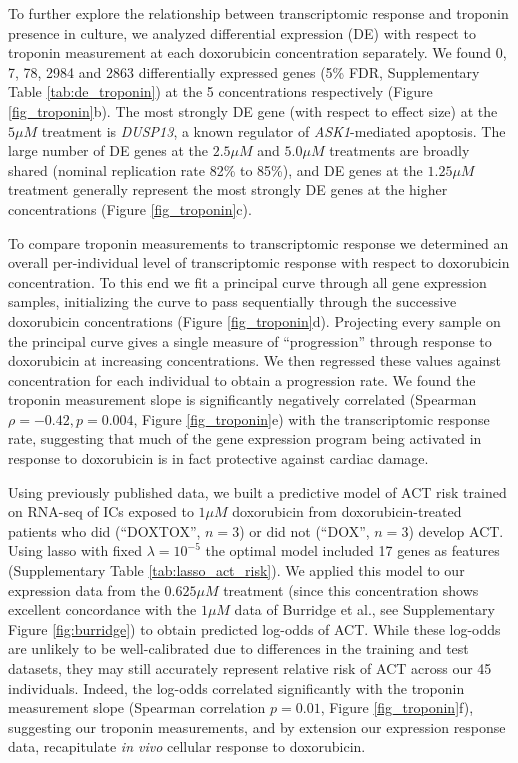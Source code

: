 \documentclass{article}
\begin{document}
To further explore the relationship between transcriptomic response and troponin presence in culture, we analyzed differential expression (DE) with respect to troponin measurement at each doxorubicin concentration separately. We found 0, 7, 78, 2984 and 2863 differentially expressed genes (5\% FDR, Supplementary Table \ref{tab:de_troponin}) at the 5 concentrations respectively (Figure \ref{fig_troponin}b). The most strongly DE gene (with respect to effect size) at the $5 \mu M$ treatment is \emph{DUSP13}, a known regulator of \emph{ASK1}-mediated apoptosis\cite{park2010positive}. The large number of DE genes at the $2.5 \mu M$ and $5.0 \mu M$ treatments are broadly shared (nominal replication rate 82\% to 85\%), and DE genes at the $1.25 \mu M$ treatment generally represent the most strongly DE genes at the higher concentrations (Figure \ref{fig_troponin}c). 

To compare troponin measurements to transcriptomic response we determined an overall per-individual level of transcriptomic response with respect to doxorubicin concentration. To this end we fit a principal curve\citep{hastie1989principal} through all gene expression samples, initializing the curve to pass sequentially through the successive doxorubicin concentrations (Figure \ref{fig_troponin}d). Projecting every sample on the principal curve gives a single measure of ``progression'' through response to doxorubicin at increasing concentrations. We then regressed these values against concentration for each individual to obtain a progression rate. We found the troponin measurement slope is significantly negatively correlated (Spearman $\rho=-0.42, p=0.004$, Figure \ref{fig_troponin}e) with the transcriptomic response rate, suggesting that much of the gene expression program being activated in response to doxorubicin is in fact protective against cardiac damage. 

Using previously published data\cite{Burridge2016}, we built a predictive model of ACT risk trained on RNA-seq of ICs exposed to $1 \mu M$ doxorubicin from doxorubicin-treated patients who did (``DOXTOX'', $n=3$) or did not (``DOX'', $n=3$) develop ACT. Using lasso with fixed $\lambda=10^{-5}$ the optimal model included 17 genes as features (Supplementary Table \ref{tab:lasso_act_risk}). We applied this model to our expression data from the $0.625 \mu M$ treatment (since this concentration shows excellent concordance with the $1 \mu M$ data of Burridge et al., see Supplementary Figure \ref{fig:burridge}) to obtain predicted log-odds of ACT. While these log-odds are unlikely to be well-calibrated due to differences in the training and test datasets, they may still accurately represent relative risk of ACT across our 45 individuals. Indeed, the log-odds correlated significantly with the troponin measurement slope (Spearman correlation $p=0.01$, Figure \ref{fig_troponin}f), suggesting our troponin measurements, and by extension our expression response data, recapitulate \emph{in vivo} cellular response to doxorubicin. 
\end{document}

